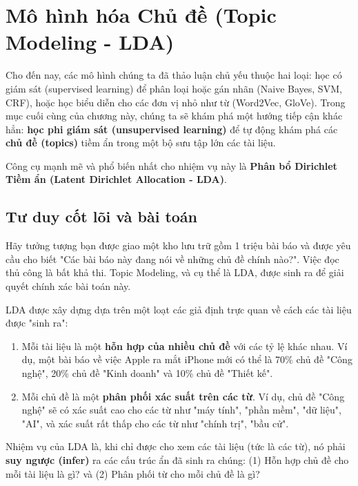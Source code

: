 
\section{Mô hình hóa Chủ đề (Topic Modeling - LDA)}
\label{sec:topic_modeling_lda}

Cho đến nay, các mô hình chúng ta đã thảo luận chủ yếu thuộc hai loại: học có giám sát (supervised learning) để phân loại hoặc gán nhãn (Naive Bayes, SVM, CRF), hoặc học biểu diễn cho các đơn vị nhỏ như từ (Word2Vec, GloVe). Trong mục cuối cùng của chương này, chúng ta sẽ khám phá một hướng tiếp cận khác hẳn: \textbf{học phi giám sát (unsupervised learning)} để tự động khám phá các \textbf{chủ đề (topics)} tiềm ẩn trong một bộ sưu tập lớn các tài liệu.

Công cụ mạnh mẽ và phổ biến nhất cho nhiệm vụ này là \textbf{Phân bổ Dirichlet Tiềm ẩn (Latent Dirichlet Allocation - LDA)}\cite{blei2003latent}.

\subsection{Tư duy cốt lõi và bài toán}
Hãy tưởng tượng bạn được giao một kho lưu trữ gồm 1 triệu bài báo và được yêu cầu cho biết "Các bài báo này đang nói về những chủ đề chính nào?". Việc đọc thủ công là bất khả thi. Topic Modeling, và cụ thể là LDA, được sinh ra để giải quyết chính xác bài toán này.

LDA được xây dựng dựa trên một loạt các giả định trực quan về cách các tài liệu được "sinh ra":
\begin{enumerate}
    \item Mỗi tài liệu là một \textbf{hỗn hợp của nhiều chủ đề} với các tỷ lệ khác nhau. Ví dụ, một bài báo về việc Apple ra mắt iPhone mới có thể là 70\% chủ đề "Công nghệ", 20\% chủ đề "Kinh doanh" và 10\% chủ đề "Thiết kế".
    \item Mỗi chủ đề là một \textbf{phân phối xác suất trên các từ}. Ví dụ, chủ đề "Công nghệ" sẽ có xác suất cao cho các từ như "máy tính", "phần mềm", "dữ liệu", "AI", và xác suất rất thấp cho các từ như "chính trị", "bầu cử".
\end{enumerate}
Nhiệm vụ của LDA là, khi chỉ được cho xem các tài liệu (tức là các từ), nó phải \textbf{suy ngược (infer)} ra các cấu trúc ẩn đã sinh ra chúng: (1) Hỗn hợp chủ đề cho mỗi tài liệu là gì? và (2) Phân phối từ cho mỗi chủ đề là gì?


